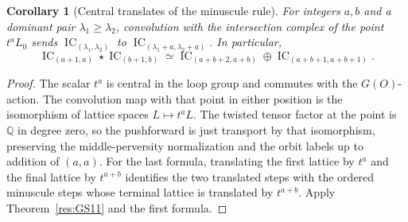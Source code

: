 \documentclass[11pt,oneside,openany]{book}
\newtheorem{corollary}[theorem]{Corollary}
\theoremstyle{definition}
\theoremstyle{remark}
\begin{document}
\begin{corollary}[Central translates of the minuscule rule]
\label{res:GS12}
For integers \(a,b\) and a dominant pair \(\lambda_1\geq\lambda_2\),
convolution with the intersection complex of the point \(t^aL_0\) sends
\(\operatorname{IC}_{(\lambda_1,\lambda_2)}\) to
\(\operatorname{IC}_{(\lambda_1+a,\lambda_2+a)}\).
In particular,
\[
 \operatorname{IC}_{(a+1,a)}\star\operatorname{IC}_{(b+1,b)}
 \simeq \operatorname{IC}_{(a+b+2,a+b)}
             \oplus\operatorname{IC}_{(a+b+1,a+b+1)} .
\]
\end{corollary}

\begin{proof}
The scalar \(t^a\) is central in the loop group and commutes
with the \(G(O)\)-action. The convolution map with that
point in either position is the isomorphism of lattice
spaces \(L\mapsto t^aL\). The twisted tensor factor at the
point is \(\mathbb Q\) in degree zero, so the pushforward
is just transport by that isomorphism, preserving the
middle-perversity normalization and the orbit labels
up to addition of \((a,a)\).
For the last formula, translating the first lattice by
\(t^a\) and the final lattice by \(t^{a+b}\) identifies
the two translated steps with the ordered minuscule
steps whose terminal lattice is translated by \(t^{a+b}\).
Apply Theorem~\ref{res:GS11} and the first formula.
\end{proof}
\backmatter
\begingroup
\footnotesize
\end{document}
